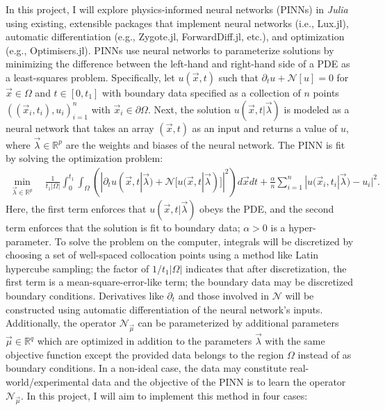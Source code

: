 \documentclass[10pt]{article}
\newcommand{\R}{\mathbb R}
\newcommand{\1}{\mathbf 1}
\begin{document}
In this project, I will explore physics-informed neural networks (PINNs) in {\em Julia} using existing, extensible packages that implement neural networks (i.e., Lux.jl), automatic differentiation (e.g., Zygote.jl, ForwardDiff.jl, etc.), and optimization (e.g., Optimisers.jl).
PINNs use neural networks to parameterize solutions by minimizing the difference between the left-hand and right-hand side of a PDE as a least-squares problem.
Specifically, let $u(\vec x,t)$ such that $\partial_t u + \mathcal{N}[u] = 0$ for $\vec x \in \Omega$ and $t \in [0,t_1]$ with boundary data specified as a collection of $n$ points $((\vec x_i,t_i),u_i)_{i=1}^n$ with $\vec x_i \in \partial \Omega$.
Next, the solution $u(\vec x, t|\vec \lambda)$ is modeled as a neural network that takes an array $(\vec x,t)$ as an input and returns a value of $u$, where $\vec \lambda \in \R^p$ are the weights and biases of the neural network.
The PINN is fit by solving the optimization problem:
\begin{align}
	\min_{\vec \lambda \in \R^p} \quad
	\frac{1}{t_1 |\Omega|}
	\int_0^{t_1}
	\int_\Omega\left( | \partial_t u(\vec x,t| \vec \lambda)  + \mathcal{N}[u(\vec x,t | \vec \lambda)]|^2 \right)d \vec x dt + \frac{\alpha }{n}\sum_{i=1}^n|u(\vec x_i,t_i | \vec \lambda) - u_i|^2.
	\label{PINNobj}
\end{align}
Here, the first term enforces that $u(\vec x,t| \vec \lambda)$ obeys the PDE, and the second term enforces that the solution is fit to boundary data; $\alpha>0$ is a hyper-parameter.
To solve the problem on the computer, integrals will be discretized by choosing a set of well-spaced collocation points using a method like Latin hypercube sampling; the factor of $1/t_1|\Omega|$ indicates that after discretization, the first term is a mean-square-error-like term; the boundary data may be discretized boundary conditions.
Derivatives like $\partial_t$ and those involved in $\mathcal{N}$ will be constructed using automatic differentiation of the neural network's inputs.
Additionally, the operator $\mathcal{N}_{\vec \mu}$ can be parameterized by additional parameters $\vec \mu \in \R^q$ which are optimized in addition to the parameters $\vec \lambda$ with the same objective function except the provided data belongs to the region $\Omega$ instead of as boundary conditions.
In a non-ideal case, the data may constitute real-world/experimental data and the objective of the PINN is to learn the operator $\mathcal{N}_{\vec \mu}$.
In this project, I will aim to implement this method in four cases:
\end{document}
